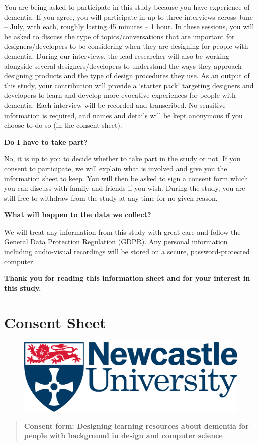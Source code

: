 You are being asked to participate in this study because you have experience of dementia. If you agree, you will participate in up to three interviews across June – July, with each, roughly lasting 45 minutes – 1 hour.  In these sessions, you will be asked to discuss the type of topics/conversations that are important for designers/developers to be considering when they are designing for people with dementia. During our interviews, the lead researcher will also be working alongside several designers/developers to understand the ways they approach designing products and the type of design procedures they use. As an output of this study, your contribution will provide a ‘starter pack’ targeting designers and developers to learn and develop more evocative experiences for people with dementia. Each interview will be recorded and transcribed. No sensitive information is required, and names and details will be kept anonymous if you choose to do so (in the consent sheet). 

\textbf{Do I have to take part?}

No, it is up to you to decide whether to take part in the study or not. If you consent to participate, we will explain what is involved and give you the information sheet to keep. You will then be asked to sign a consent form which you can discuss with family and friends if you wish. During the study, you are still free to withdraw from the study at any time for no given reason.

\textbf{What will happen to the data we collect?}

We will treat any information from this study with great care and follow the General Data Protection Regulation (GDPR). Any personal information including audio-visual recordings will be stored on a secure, password-protected computer.

\textbf{Thank you for reading this information sheet and for your interest in this study.
}

\newpage

\section{Consent Sheet}
\label{app:ConSheets}
\begin{figure}[htp]
    \centering
    \includegraphics[width=0.5\linewidth]{Images/logo.png}
\end{figure}
\begin{quote}
\textbf{Consent form: Designing learning resources about dementia for people with background
in design and computer science}
\end{quote}

